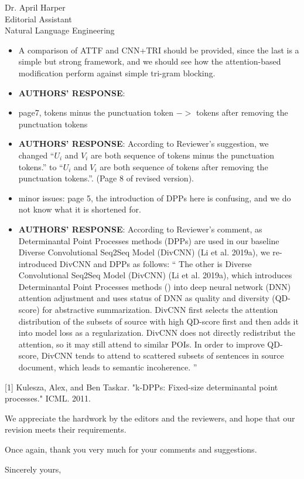 \documentclass[11pt]{letter} %
\theoremstyle{definition}
\begin{document}
\begin{letter}{Dr. April Harper \\
            Editorial Assistant \\
			Natural Language Engineering}
\begin{enumerate}
\begin{itemize}
				
				\item A comparison of ATTF and CNN+TRI should be provided, since the last is a simple but strong framework, and we should see how the attention-based modification perform against simple tri-gram blocking.
				\item[] \textbf{AUTHORS' RESPONSE}:  
				
				\item page7, tokens minus the punctuation token $->$ tokens after removing the punctuation tokens
				\item[] \textbf{AUTHORS' RESPONSE}:  
				According to Reviewer's suggestion, we changed ``$U_i$ and $V_i$ are both sequence of tokens minus the punctuation tokens.''
				to 
				``$U_i$ and $V_i$ are both sequence of tokens after removing the punctuation tokens.''. (Page 8 of revised version).
				
				\item minor issues: page 5, the introduction of DPPs here is confusing, and we do not know what it is shortened for.
				\item[] \textbf{AUTHORS' RESPONSE}:  
				According to Reviewer's comment, as  Determinantal Point Processes methods (DPPs) are used in our baseline Diverse Convolutional Seq2Seq Model (DivCNN) (Li et al. 2019a), we re-introduced DivCNN and DPPs as follows:
				``
				The other is Diverse Convolutional Seq2Seq
				Model (DivCNN) (Li et al. 2019a), 
				which introduces Determinantal Point Processes methods () into deep neural network (DNN) attention adjustment
				and uses status of DNN as quality and diversity (QD-score) for abstractive summarization.
				DivCNN first selects the attention distribution of the subsets of source with high QD-score
				first and then adds it into model loss as a regularization.
				DivCNN does not directly redistribut the attention,
				so it may still attend to similar POIs.
				In order to improve QD-score, DivCNN tends to attend to scattered subsets of sentences in source document,
				which leads to semantic incoherence. 
				''
                

			\end{itemize}
		\end{enumerate}
                
	    [1] Kulesza, Alex, and Ben Taskar. "k-DPPs: Fixed-size determinantal point processes." ICML. 2011.
	
		We appreciate the hardwork by the editors and the reviewers,
		and hope that our revision meets their requirements.
		
		Once again, thank you very much for  your comments and suggestions.
		
		
		\closing{Sincerely yours,}
		
		
		
		
	\end{letter}
	
\end{document}
